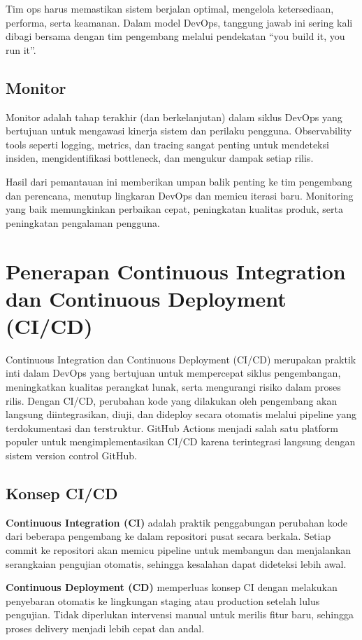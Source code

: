 Tim ops harus memastikan sistem berjalan optimal, mengelola ketersediaan, performa, serta keamanan. Dalam model DevOps, tanggung jawab ini sering kali dibagi bersama dengan tim pengembang melalui pendekatan “you build it, you run it”.

\subsection{Monitor}

Monitor adalah tahap terakhir (dan berkelanjutan) dalam siklus DevOps yang bertujuan untuk mengawasi kinerja sistem dan perilaku pengguna. Observability tools seperti logging, metrics, dan tracing sangat penting untuk mendeteksi insiden, mengidentifikasi bottleneck, dan mengukur dampak setiap rilis.

Hasil dari pemantauan ini memberikan umpan balik penting ke tim pengembang dan perencana, menutup lingkaran DevOps dan memicu iterasi baru. Monitoring yang baik memungkinkan perbaikan cepat, peningkatan kualitas produk, serta peningkatan pengalaman pengguna.


\section{Penerapan Continuous Integration dan Continuous Deployment (CI/CD)}

Continuous Integration dan Continuous Deployment (CI/CD) merupakan praktik inti dalam DevOps yang bertujuan untuk mempercepat siklus pengembangan, meningkatkan kualitas perangkat lunak, serta mengurangi risiko dalam proses rilis. Dengan CI/CD, perubahan kode yang dilakukan oleh pengembang akan langsung diintegrasikan, diuji, dan dideploy secara otomatis melalui pipeline yang terdokumentasi dan terstruktur. GitHub Actions menjadi salah satu platform populer untuk mengimplementasikan CI/CD karena terintegrasi langsung dengan sistem version control GitHub.

\subsection{Konsep CI/CD}

\textbf{Continuous Integration (CI)} adalah praktik penggabungan perubahan kode dari beberapa pengembang ke dalam repositori pusat secara berkala. Setiap commit ke repositori akan memicu pipeline untuk membangun dan menjalankan serangkaian pengujian otomatis, sehingga kesalahan dapat dideteksi lebih awal.

\textbf{Continuous Deployment (CD)} memperluas konsep CI dengan melakukan penyebaran otomatis ke lingkungan staging atau production setelah lulus pengujian. Tidak diperlukan intervensi manual untuk merilis fitur baru, sehingga proses delivery menjadi lebih cepat dan andal.

